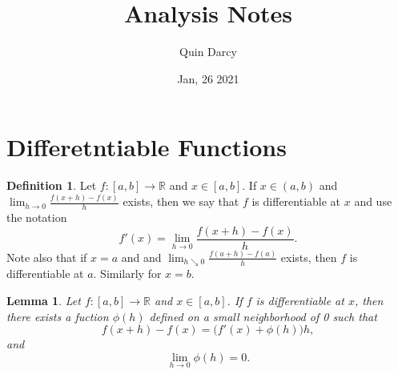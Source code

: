 \documentclass[12pt]{article}
\newtheorem{lemma}[theorem]{Lemma}
\theoremstyle{definition}
\newtheorem{definition}{Definition}[section]
\theoremstyle{definition}
\begin{document}
\title{Analysis Notes}
\author{Quin Darcy}
\date{Jan, 26 2021}
\maketitle
\section{Differetntiable Functions}
    \begin{definition}
        Let $f:[a, b]\to\mathbb{R}$ and $x\in[a, b]$. If $x\in(a, b)$ and
        $\lim_{h\to 0}\frac{f(x+h)-f(x)}{h}$ exists, then we say that $f$ is
        differentiable at $x$ and use the notation
            \begin{equation*}
                f'(x)=\lim_{h\to 0}\frac{f(x+h)-f(x)}{h}.
            \end{equation*}
        Note also that if $x=a$ and and $\lim_{h\searrow
        0}\frac{f(a+h)-f(a)}{h}$ exists, then $f$ is differentiable at $a$.
        Similarly for $x=b$.
    \end{definition}
    \begin{lemma}
        Let $f:[a, b]\to \mathbb{R}$ and $x\in[a, b]$. If $f$ is differentiable
        at $x$, then there exists a fuction $\phi(h)$ defined on a small
        neighborhood of 0 such that 
            \begin{equation*}
                f(x+h)-f(x)=\big(f'(x)+\phi(h))h,
            \end{equation*}
        and 
            \begin{equation*}
                \lim_{h\to 0}\phi(h)=0.
            \end{equation*}

    \end{lemma}
\end{document}
